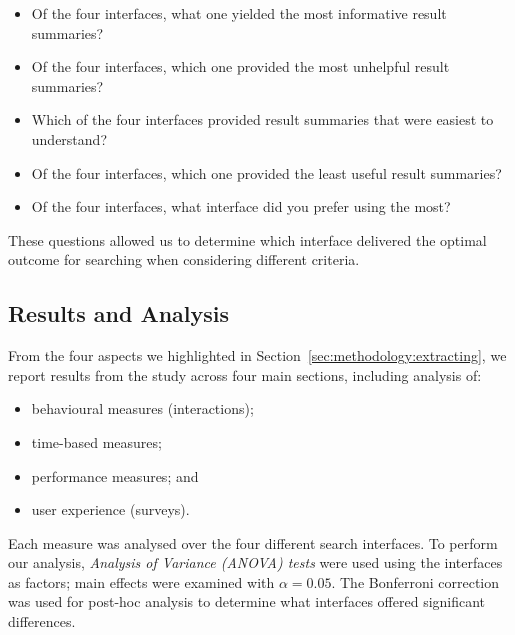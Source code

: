 \begin{itemize}
    \item{ Of the four interfaces, what one yielded the most informative result summaries?}
    \item{ Of the four interfaces, which one provided the most unhelpful result summaries?}
    \item{ Which of the four interfaces provided result summaries that were easiest to understand?}
    \item{ Of the four interfaces, which one provided the least useful result summaries?}
    \item{ Of the four interfaces, what interface did you prefer using the most?}
\end{itemize}

These questions allowed us to determine which interface delivered the optimal outcome for searching when considering different criteria.

\subsection{Results and Analysis}\label{chap:snippets:user:results}
From the four aspects we highlighted in Section~\ref{sec:methodology:extracting}, we report results from the study across four main sections, including analysis of:

\begin{itemize}
    \item{behavioural measures (interactions);}
    \item{time-based measures;}
    \item{performance measures; and}
    \item{user experience (surveys).}
\end{itemize}

Each measure was analysed over the four different search interfaces. To perform our analysis, \emph{Analysis of Variance (ANOVA) tests} were used using the interfaces as factors; main effects were examined with $\alpha = 0.05$. The Bonferroni correction was used for post-hoc analysis to determine what interfaces offered significant differences.

